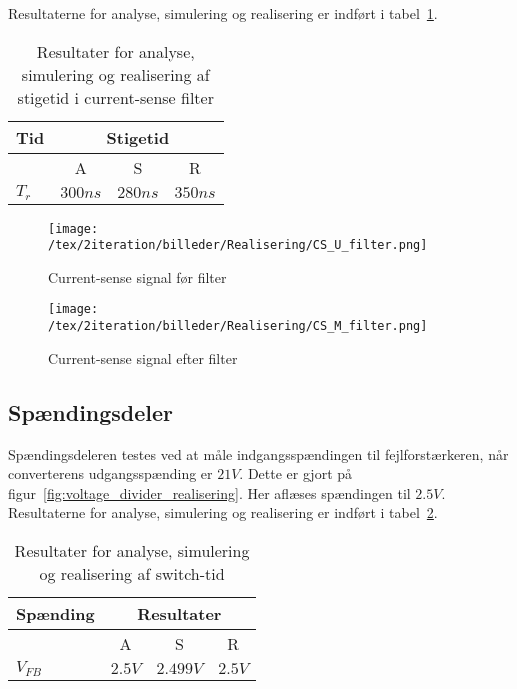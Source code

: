\noindent Resultaterne for analyse, simulering og realisering er indført i tabel~\ref{tab:resultater_cs_filter_2}.


\begin{table}[H] 			
	\centering
	\begin{tabularx}{\textwidth}{|X|c|c|c|}
		\hline
		\textbf{Tid} & \multicolumn{3}{|c|}{\textbf{Stigetid}} 										\\ \hline
		& A & S & R 									\\ \hline
		$T_{r}$ & $300ns$ & $280ns$ & $350ns$ 									\\ \hline 
		
	\end{tabularx}
	\caption{Resultater for analyse, simulering og realisering af stigetid i current-sense filter}
	\label{tab:resultater_cs_filter_2}
\end{table}

\begin{figure}[H]
	\center
	\texttt{[image: /tex/2iteration/billeder/Realisering/CS\_U\_filter.png]}
	\caption{Current-sense signal før filter}
	\label{fig:CS_U_filter}
\end{figure}

\begin{figure}[H]
	\center
	\texttt{[image: /tex/2iteration/billeder/Realisering/CS\_M\_filter.png]}
	\caption{Current-sense signal efter filter}
	\label{fig:CS_M_filter}
\end{figure}


\subsection{Spændingsdeler}
\noindent Spændingsdeleren testes ved at måle indgangsspændingen til fejlforstærkeren, når converterens udgangsspænding er $21V$. Dette er gjort på figur~\ref{fig:voltage_divider_realisering}. Her aflæses spændingen til $2.5V$. Resultaterne for analyse, simulering og realisering er indført i tabel~\ref{tab:resultat_voltage_divider}.


\begin{table}[H] 			
	\centering
	\begin{tabularx}{\textwidth}{|X|c|c|c|}
		\hline
		\textbf{Spænding} & \multicolumn{3}{|c|}{\textbf{Resultater}} 		\\ \hline
		& A & S & R 									\\ \hline
		$V_{FB}$ & $2.5V$ & $2.499V$ & $2.5V$ 									\\ \hline 
		
	\end{tabularx}
	\caption{Resultater for analyse, simulering og realisering af switch-tid}
	\label{tab:resultat_voltage_divider}
\end{table}

